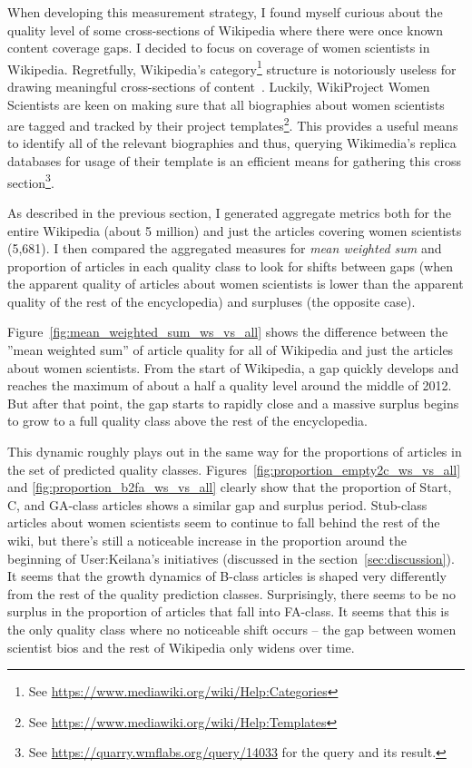 When developing this measurement strategy, I found myself curious about the quality level of some cross-sections of Wikipedia where there were once known content coverage gaps.  I decided to focus on coverage of women scientists in Wikipedia.  Regretfully, Wikipedia's category\footnote{See \url{https://www.mediawiki.org/wiki/Help:Categories}} structure is notoriously useless for drawing meaningful cross-sections of content~\cite{kittur09what}.  Luckily, WikiProject Women Scientists are keen on making sure that all biographies about women scientists are tagged and tracked by their project templates\footnote{See \url{https://www.mediawiki.org/wiki/Help:Templates}}.  This provides a useful means to identify all of the relevant biographies and thus, querying Wikimedia's replica databases for usage of their template is an efficient means for gathering this cross section\footnote{See \url{https://quarry.wmflabs.org/query/14033} for the query and its result.}.

As described in the previous section, I generated aggregate metrics both for the entire Wikipedia (about 5 million) and just the articles covering women scientists (5,681).  I then compared the aggregated measures for \emph{mean weighted sum} and proportion of articles in each quality class to look for shifts between gaps (when the apparent quality of articles about women scientists is lower than the apparent quality of the rest of the encyclopedia) and surpluses (the opposite case).



Figure~\ref{fig:mean_weighted_sum_ws_vs_all} shows the difference between the ''mean weighted sum'' of article quality for all of Wikipedia and just the articles about women scientists.  From the start of Wikipedia, a gap quickly develops and reaches the maximum of about a half a quality level around the middle of 2012.  But after that point, the gap starts to rapidly close and a massive surplus begins to grow to a full quality class above the rest of the encyclopedia.

This dynamic roughly plays out in the same way for the proportions of articles in the set of predicted quality classes.  Figures~\ref{fig:proportion_empty2c_ws_vs_all} and \ref{fig:proportion_b2fa_ws_vs_all} clearly show that the proportion of Start, C, and GA-class articles shows a similar gap and surplus period.  Stub-class articles about women scientists seem to continue to fall behind the rest of the wiki, but there's still a noticeable increase in the proportion around the beginning of User:Keilana's initiatives (discussed in the section~\ref{sec:discussion}).  It seems that the growth dynamics of B-class articles is shaped very differently from the rest of the quality prediction classes.  Surprisingly, there seems to be no surplus in the proportion of articles that fall into FA-class.  It seems that this is the only quality class where no noticeable shift occurs -- the gap between women scientist bios and the rest of Wikipedia only widens over time.

